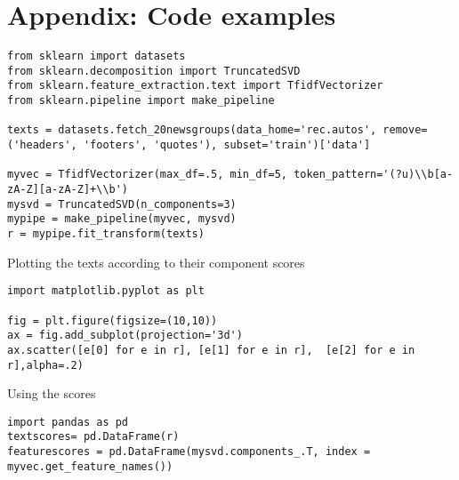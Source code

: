 \section[Appendix]{Appendix: Code examples}


\begin{frame}{}
  \begin{verbatim}
from sklearn import datasets
from sklearn.decomposition import TruncatedSVD
from sklearn.feature_extraction.text import TfidfVectorizer
from sklearn.pipeline import make_pipeline

texts = datasets.fetch_20newsgroups(data_home='rec.autos', remove=('headers', 'footers', 'quotes'), subset='train')['data']

myvec = TfidfVectorizer(max_df=.5, min_df=5, token_pattern='(?u)\\b[a-zA-Z][a-zA-Z]+\\b')
mysvd = TruncatedSVD(n_components=3)
mypipe = make_pipeline(myvec, mysvd)
r = mypipe.fit_transform(texts)
\end{verbatim}
\end{frame}





\begin{frame}[fragile]{Plotting the texts according to their component scores}
\begin{lstlisting}
import matplotlib.pyplot as plt

fig = plt.figure(figsize=(10,10))
ax = fig.add_subplot(projection='3d')
ax.scatter([e[0] for e in r], [e[1] for e in r],  [e[2] for e in r],alpha=.2)
\end{lstlisting}


\end{frame}



\begin{frame}[fragile]{Using the scores}
\begin{lstlisting}
import pandas as pd
textscores= pd.DataFrame(r)
featurescores = pd.DataFrame(mysvd.components_.T, index = myvec.get_feature_names())
\end{lstlisting}


\end{frame}




